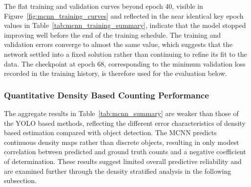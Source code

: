 \documentclass[12pt,a4paper]{report}
\begin{document}
The flat training and validation curves beyond epoch 40, visible in Figure~\ref{fig:mcnn_training_curves} and reflected in the near identical key epoch values in Table~\ref{tab:mcnn_training_summary}, indicate that the model stopped improving well before the end of the training schedule. The training and validation errors converge to almost the same value, which suggests that the network settled into a fixed solution rather than continuing to refine its fit to the data. The checkpoint at epoch 68, corresponding to the minimum validation loss recorded in the training history, is therefore used for the evaluation below.

\subsubsection{Quantitative Density Based Counting Performance}

The aggregate results in Table~\ref{tab:mcnn_summary} are weaker than those of the YOLO based methods, reflecting the different error characteristics of density based estimation compared with object detection. The MCNN predicts continuous density maps rather than discrete objects, resulting in only modest correlation between predicted and ground truth counts and a negative coefficient of determination. These results suggest limited overall predictive reliability and are examined further through the density stratified analysis in the following subsection.
\end{document}
